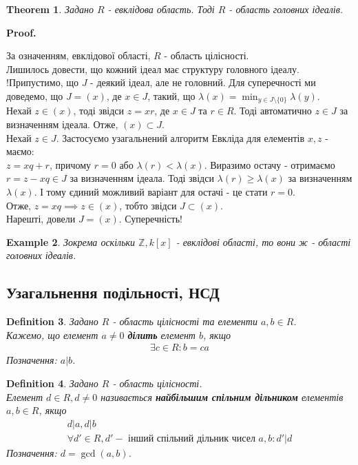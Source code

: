 \documentclass[a4paper, 14pt]{extarticle}
\makeatletter
\theoremstyle{theoremdd}
\newtheorem{theorem}{Theorem}[subsection]
\theoremstyle{theoremdd}
\newtheorem{definition}[theorem]{Definition}
\theoremstyle{theoremdd}
\theoremstyle{theoremdd}
\newtheorem{example}[theorem]{Example}
\theoremstyle{theoremdd}
\theoremstyle{theoremdd}
\theoremstyle{theoremdd}
\theoremstyle{theoremdd}
\def\qed{$\blacksquare$}
\renewenvironment{proof}[1][Proof.\\]{\par
\pushQED{\hfill \qed}%
\normalfont \topsep6\p@\@plus6\p@\relax
\trivlist
\item\relax
{\bfseries
#1\@addpunct{.}}\hspace\labelsep\ignorespaces
}{%
\popQED\endtrivlist\@endpefalse
}
\makeatother
\begin{document}
\begin{theorem}
Задано $R$ - евклідова область. Тоді $R$ - область головних ідеалів.
\end{theorem}

\begin{proof}
За означенням, евклідової області, $R$ - область цілісності.\\
Лишилось довести, що кожний ідеал має структуру головного ідеалу.\\
!Припустимо, що $J$ - деякий ідеал, але не головний. Для суперечності ми доведемо, що $J = (x)$, де $x \in J$, такий, що $\lambda(x) = \displaystyle\min_{y \in J \setminus \{0\}} \lambda(y)$.\\
Нехай $z \in (x)$, тоді звідси $z = xr$, де $x \in J$ та $r \in R$. Тоді автоматично $z \in J$ за визначенням ідеала. Отже, $(x) \subset J$.\\
Нехай $z \in J$. Застосуємо узагальнений алгоритм Евкліда для елементів $x,z$ - маємо:\\
$z = xq + r$, причому $r = 0$ або $\lambda(r) < \lambda(x)$. Виразимо остачу - отримаємо\\
$r = z - xq \in J$ за визначенням ідеала. Тоді звідси $\lambda(r) \geq \lambda(x)$ за визначенням $\lambda(x)$. І тому єдиний можливий варіант для остачі - це стати $r = 0$.\\
Отже, $z = xq \implies z \in (x)$, тобто звідси $J \subset (x)$.\\
Нарешті, довели $J = (x)$. Суперечність!
\end{proof}

\begin{example}
Зокрема оскільки $\mathbb{Z}, k[x]$ - евклідові області, то вони ж - області головних ідеалів.
\end{example}

\subsection{Узагальнення подільності, НСД}
\begin{definition}
Задано $R$ - область цілісності та елементи $a,b \in R$.\\
Кажемо, що елемент $a \neq 0$ \textbf{ділить} елемент $b$, якщо
\begin{align*}
\exists c \in R: b = ca
\end{align*}
Позначення: $a | b$.
\end{definition}

\begin{definition}
Задано $R$ - область цілісності.\\
Елемент $d \in R, d \neq 0$ називається \textbf{найбільшим спільним дільником} елементів $a,b \in R$, якщо
\begin{align*}
d | a, d | b \\
\forall d' \in R, d' - \text{ інший спільний дільник чисел } a,b: d' | d
\end{align*}
Позначення: $d = \gcd (a,b)$.
\end{definition}
\end{document}
